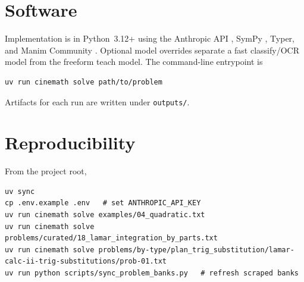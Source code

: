 \documentclass[11pt]{article}
\begin{document}
\section*{Software}

Implementation is in Python~3.12+ using the Anthropic API
\citep{anthropic2024claude}, SymPy \citep{meurer2017sympy}, Typer, and Manim
Community \citep{manim2024community}. Optional model overrides separate a
fast classify/OCR model from the freeform teach model. The command-line
entrypoint is
\begin{verbatim}
uv run cinemath solve path/to/problem
\end{verbatim}
Artifacts for each run are written under \texttt{outputs/}.

\appendix

\section{Reproducibility}
\label{app:repro}

From the project root,
\begin{verbatim}
uv sync
cp .env.example .env   # set ANTHROPIC_API_KEY
uv run cinemath solve examples/04_quadratic.txt
uv run cinemath solve problems/curated/18_lamar_integration_by_parts.txt
uv run cinemath solve problems/by-type/plan_trig_substitution/lamar-calc-ii-trig-substitutions/prob-01.txt
uv run python scripts/sync_problem_banks.py   # refresh scraped banks
\end{verbatim}



\end{document}
